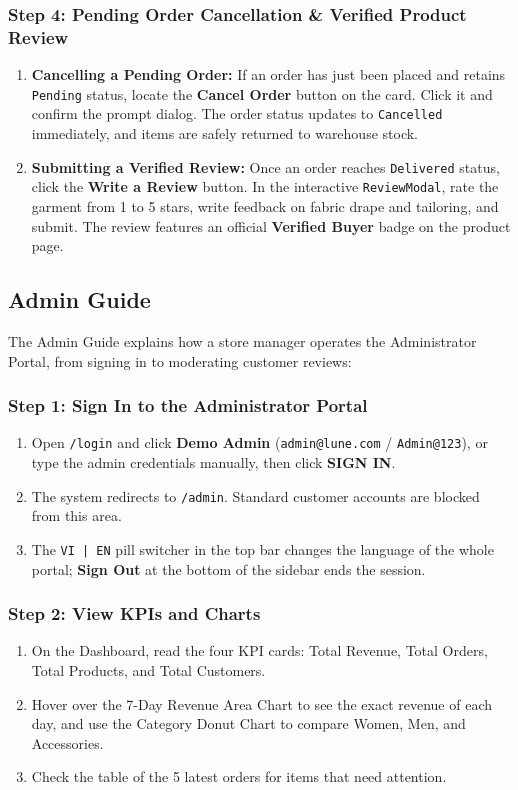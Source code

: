 \documentclass[12pt,a4paper,oneside]{report}
\begin{document}
\subsubsection{Step 4: Pending Order Cancellation \& Verified Product Review}
\begin{enumerate}[leftmargin=1.2cm]
    \item \textbf{Cancelling a Pending Order:} If an order has just been placed and retains \texttt{Pending} status, locate the \textbf{Cancel Order} button on the card. Click it and confirm the prompt dialog. The order status updates to \texttt{Cancelled} immediately, and items are safely returned to warehouse stock.
    \item \textbf{Submitting a Verified Review:} Once an order reaches \texttt{Delivered} status, click the \textbf{Write a Review} button. In the interactive \texttt{ReviewModal}, rate the garment from 1 to 5 stars, write feedback on fabric drape and tailoring, and submit. The review features an official \textbf{Verified Buyer} badge on the product page.
\end{enumerate}

\subsection{Admin Guide}
The Admin Guide explains how a store manager operates the Administrator Portal, from signing in to moderating customer reviews:

\subsubsection{Step 1: Sign In to the Administrator Portal}
\begin{enumerate}[leftmargin=1.2cm]
    \item Open \texttt{/login} and click \textbf{Demo Admin} (\texttt{admin@lune.com} / \texttt{Admin@123}), or type the admin credentials manually, then click \textbf{SIGN IN}.
    \item The system redirects to \texttt{/admin}. Standard customer accounts are blocked from this area.
    \item The \texttt{VI | EN} pill switcher in the top bar changes the language of the whole portal; \textbf{Sign Out} at the bottom of the sidebar ends the session.
\end{enumerate}

\subsubsection{Step 2: View KPIs and Charts}
\begin{enumerate}[leftmargin=1.2cm]
    \item On the Dashboard, read the four KPI cards: Total Revenue, Total Orders, Total Products, and Total Customers.
    \item Hover over the 7-Day Revenue Area Chart to see the exact revenue of each day, and use the Category Donut Chart to compare Women, Men, and Accessories.
    \item Check the table of the 5 latest orders for items that need attention.
\end{enumerate}
\end{document}
